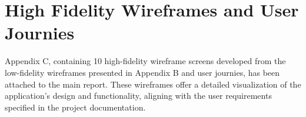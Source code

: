 \section{High Fidelity Wireframes and User Journies}
\par 
Appendix C, containing 10 high-fidelity wireframe screens developed from the low-fidelity wireframes presented in Appendix B and user journies, has been attached to the main report. These wireframes offer a detailed visualization of the application's design and functionality, aligning with the user requirements specified in the project documentation.